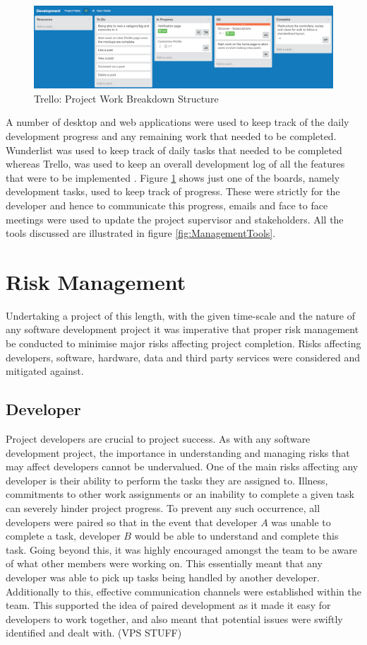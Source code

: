 \begin{figure}[H]
	\centering
	\includegraphics[width=1.0\textwidth]{Images/ProjectManagement/Trello}
	\caption{Trello: Project Work Breakdown Structure} \label{fig:Trello_WBS}
\end{figure}

A number of desktop and web applications were used to keep track of the daily development progress and any remaining work that needed to be completed. Wunderlist was used to keep track of daily tasks that needed to be completed whereas Trello, was used to keep an overall development log of all the features that were to be implemented \cite{Wunderlist:Home, Trello:Home}. Figure \ref{fig:Trello_WBS} shows just one of the boards, namely development tasks, used to keep track of progress. These were strictly for the developer and hence to communicate this progress, emails and face to face meetings were used to update the project supervisor and stakeholders. All the tools discussed are illustrated in figure \ref{fig:ManagementTools}.

\section{Risk Management}
Undertaking a project of this length, with the given time-scale and the nature of any software development project it was imperative that proper risk management be conducted to minimise major risks affecting project completion. Risks affecting developers, software, hardware, data and third party services were considered and mitigated against.

\subsection{Developer}
Project developers are crucial to project success. As with any software development project, the importance in understanding and managing risks that may affect developers cannot be undervalued. One of the main risks affecting any developer is their ability to perform the tasks they are assigned to. Illness, commitments to other work assignments or an inability to complete a given task can severely hinder project progress. To prevent any such occurrence, all developers were paired so that in the event that developer $A$ was unable to complete a task, developer $B$ would be able to understand and complete this task. Going beyond this, it was highly encouraged amongst the team to be aware of what other members were working on. This essentially meant that any developer was able to pick up tasks being handled by another developer. Additionally to this, effective communication channels were established within the team. This supported the idea of paired development as it made it easy for developers to work together, and also meant that potential issues were swiftly identified and dealt with. (VPS STUFF)

